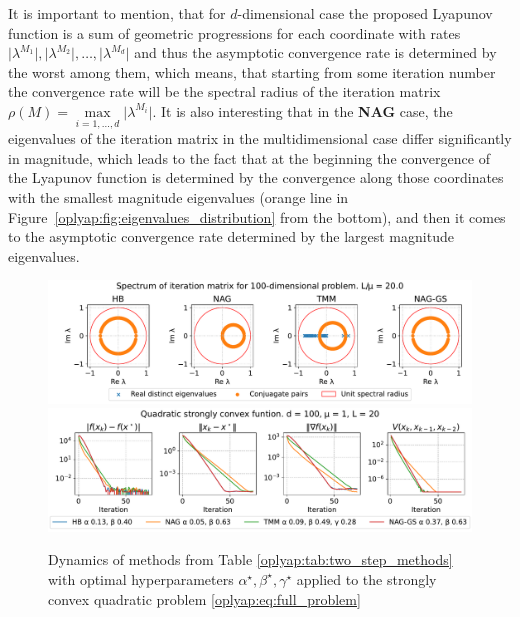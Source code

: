 \documentclass[a4paper,11pt]{article}
\begin{document}
It is important to mention, that for $d$-dimensional case the proposed Lyapunov function is a sum of geometric progressions for each coordinate with rates $\vert \lambda^{M_1} \vert, \vert \lambda^{M_2} \vert, \ldots, \vert \lambda^{M_d} \vert$ and thus the asymptotic convergence rate is determined by the worst among them, which means, that starting from some iteration number the convergence rate will be the spectral radius of the iteration matrix $\rho(M) = \max\limits_{i=1,\ldots, d} \vert \lambda^{M_i}\vert$. It is also interesting that in the \textbf{NAG} case, the eigenvalues of the iteration matrix in the multidimensional case differ significantly in magnitude, which leads to the fact that at the beginning the convergence of the Lyapunov function is determined by the convergence along those coordinates with the smallest magnitude eigenvalues (orange line in Figure~\ref{oplyap:fig:eigenvalues_distribution} from the bottom), and then it comes to the asymptotic convergence rate determined by the largest magnitude eigenvalues.

\begin{figure}[h!]
    \centering
    \includegraphics[width=\linewidth]{quad_simple_optimal_100_spectrum.pdf}
    \includegraphics[width=\linewidth]{quad_simple_optimal_100.pdf}
    \caption{Dynamics of methods from Table \ref{oplyap:tab:two_step_methods} with optimal hyperparameters $\alpha^\star, \beta^\star, \gamma^\star$ applied to the strongly convex quadratic problem \eqref{oplyap:eq:full_problem}}
   \end{figure}
\end{document}

